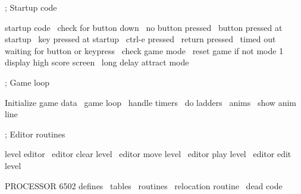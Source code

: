 \documentclass[10pt]{report}%
\begin{document}
    ; Startup code

    \LA{}startup code~{\nwtagstyle{}}\RA{}
    \LA{}check for button down~{\nwtagstyle{}}\RA{}
    \LA{}no button pressed~{\nwtagstyle{}}\RA{}
    \LA{}button pressed at startup~{\nwtagstyle{}}\RA{}
    \LA{}key pressed at startup~{\nwtagstyle{}}\RA{}
    \LA{}ctrl-e pressed~{\nwtagstyle{}}\RA{}
    \LA{}return pressed~{\nwtagstyle{}}\RA{}
    \LA{}timed out waiting for button or keypress~{\nwtagstyle{}}\RA{}
    \LA{}check game mode~{\nwtagstyle{}}\RA{}
    \LA{}reset game if not mode 1~{\nwtagstyle{}}\RA{}
    \LA{}display high score screen~{\nwtagstyle{}}\RA{}
    \LA{}long delay attract mode~{\nwtagstyle{}}\RA{}

    ; Game loop

    \LA{}Initialize game data~{\nwtagstyle{}}\RA{}
    \LA{}game loop~{\nwtagstyle{}}\RA{}
    \LA{}handle timers~{\nwtagstyle{}}\RA{}
    \LA{}do ladders~{\nwtagstyle{}}\RA{}
    \LA{}anims~{\nwtagstyle{}}\RA{}
    \LA{}show anim line~{\nwtagstyle{}}\RA{}

    ; Editor routines

    \LA{}level editor~{\nwtagstyle{}}\RA{}
    \LA{}editor clear level~{\nwtagstyle{}}\RA{}
    \LA{}editor move level~{\nwtagstyle{}}\RA{}
    \LA{}editor play level~{\nwtagstyle{}}\RA{}
    \LA{}editor edit level~{\nwtagstyle{}}\RA{}
\nwendcode{}\nwdocspar

\nwenddocs{}\endmoddef\nwstartdeflinemarkup\nwenddeflinemarkup
    PROCESSOR 6502
    \LA{}defines~{\nwtagstyle{}}\RA{}
    \LA{}tables~{\nwtagstyle{}}\RA{}
    \LA{}routines~{\nwtagstyle{}}\RA{}
    \LA{}relocation routine~{\nwtagstyle{}}\RA{}
    \LA{}dead code~{\nwtagstyle{}}\RA{}
\nwnotused{*}\nwendcode{}\nwdocspar
\end{document}
